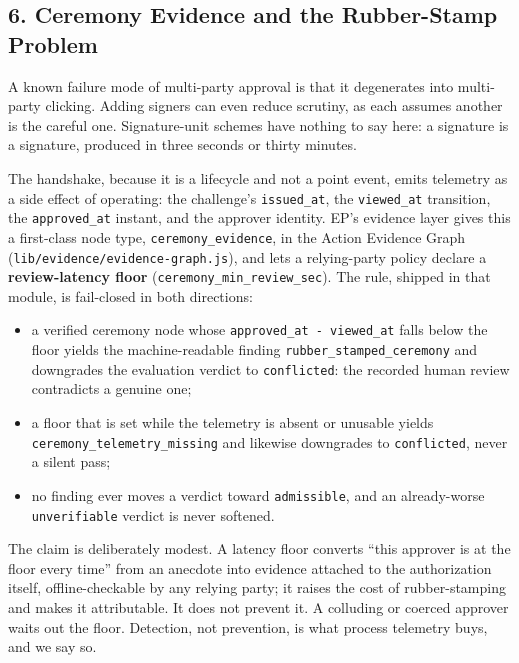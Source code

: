 \documentclass[
  11pt,
]{article}
\providecommand{\tightlist}{%
  \setlength{\itemsep}{0pt}\setlength{\parskip}{0pt}}
\begin{document}
\subsection{6. Ceremony Evidence and the Rubber-Stamp
Problem}\label{ceremony-evidence}

A known failure mode of multi-party approval is that it degenerates into
multi-party clicking. Adding signers can even reduce scrutiny, as each
assumes another is the careful one. Signature-unit schemes have nothing
to say here: a signature is a signature, produced in three seconds or
thirty minutes.

The handshake, because it is a lifecycle and not a point event, emits
telemetry as a side effect of operating: the challenge's
\texttt{issued\_at}, the \texttt{viewed\_at} transition, the
\texttt{approved\_at} instant, and the approver identity. EP's evidence
layer gives this a first-class node type, \texttt{ceremony\_evidence},
in the Action Evidence Graph (\texttt{lib/evidence/evidence-graph.js}),
and lets a relying-party policy declare a \textbf{review-latency floor}
(\texttt{ceremony\_min\_review\_sec}). The rule, shipped in that module,
is fail-closed in both directions:

\begin{itemize}
\tightlist
\item
  a verified ceremony node whose
  \texttt{approved\_at\ -\ viewed\_at} falls below the floor yields the
  machine-readable finding \texttt{rubber\_stamped\_ceremony} and
  downgrades the evaluation verdict to \texttt{conflicted}: the recorded
  human review contradicts a genuine one;
\item
  a floor that is set while the telemetry is absent or unusable yields
  \texttt{ceremony\_telemetry\_missing} and likewise downgrades to
  \texttt{conflicted}, never a silent pass;
\item
  no finding ever moves a verdict toward \texttt{admissible}, and an
  already-worse \texttt{unverifiable} verdict is never softened.
\end{itemize}

The claim is deliberately modest. A latency floor converts ``this
approver is at the floor every time'' from an anecdote into evidence
attached to the authorization itself, offline-checkable by any relying
party; it raises the cost of rubber-stamping and makes it attributable.
It does not prevent it. A colluding or coerced approver waits out the
floor. Detection, not prevention, is what process telemetry buys, and we
say so.
\end{document}
